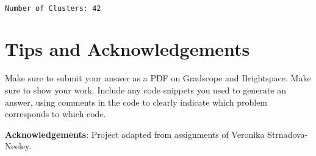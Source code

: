 \documentclass[11pt]{article}
\begin{document}
    \begin{center}
    \end{center}
    { \hspace*{\fill} \\}

    \begin{Verbatim}[commandchars=\\\{\}]
Number of Clusters: 42
    \end{Verbatim}

    \hypertarget{tips-and-acknowledgements}{%
\section*{Tips and Acknowledgements}\label{tips-and-acknowledgements}}

    Make sure to submit your answer as a PDF on Gradscope and Brightspace.
Make sure to show your work. Include any code snippets you used to
generate an answer, using comments in the code to clearly indicate which
problem corresponds to which code.

    \textbf{Acknowledgements}: Project adapted from assignments of Veronika
Strnadova-Neeley.


\end{document}
